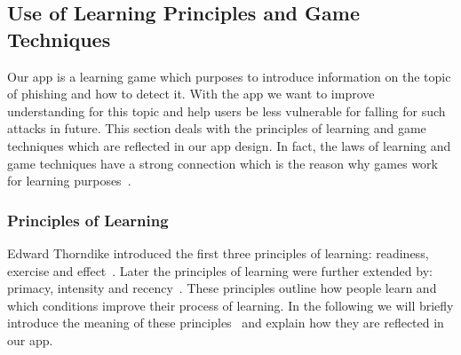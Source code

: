 \subsection{Use of Learning Principles and Game Techniques}
Our app is a learning game which purposes to introduce information on the topic of phishing and how to detect it.
With the app we want to improve understanding for this topic and help users be less vulnerable for falling for such attacks in future.
This section deals with the principles of learning and game techniques which are reflected in our app design.
In fact, the laws of learning and game techniques have a strong connection which is the reason why games work for learning purposes~\cite{murphy2011games}.
\subsubsection{Principles of Learning}
\label{s:learning_principles}
Edward Thorndike introduced the first three principles of learning: readiness, exercise and effect~\cite{thorndike1932fundamentals, murphy2011games, handbook2008us}. 
Later the principles of learning were further extended by: primacy, intensity and recency~\cite{murphy2011games, handbook2008us}.
These principles outline how people learn and which conditions improve their process of learning.
In the following we will briefly introduce the meaning of these principles~\cite{murphy2011games} and explain how they are reflected in our app.

